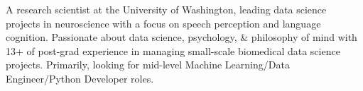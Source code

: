 

\begin{cvparagraph}

 A research scientist at the University of Washington, leading data science projects in neuroscience with a focus on speech perception and language cognition. Passionate about data science, psychology, \& philosophy of mind with 13+ of post-grad experience in managing small-scale biomedical data science projects. Primarily, looking for mid-level Machine Learning/Data Engineer/Python Developer roles.
\end{cvparagraph}
